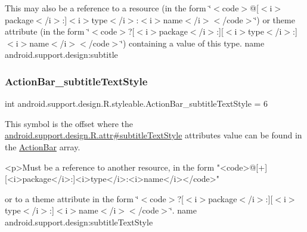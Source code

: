 This may also be a reference to a resource (in the form \char`\"{}$<$code$>$@\mbox{[}$<$i$>$package$<$/i$>$\+:\mbox{]}$<$i$>$type$<$/i$>$\+:$<$i$>$name$<$/i$>$$<$/code$>$\char`\"{}) or theme attribute (in the form \char`\"{}$<$code$>$?\mbox{[}$<$i$>$package$<$/i$>$\+:\mbox{]}\mbox{[}$<$i$>$type$<$/i$>$\+:\mbox{]}$<$i$>$name$<$/i$>$$<$/code$>$\char`\"{}) containing a value of this type.  name android.\+support.\+design\+:subtitle \mbox{\label{classandroid_1_1support_1_1design_1_1R_1_1styleable_a0773b4b5cb408a7cf70b187a6507fd8c}} 
\subsubsection{\texorpdfstring{Action\+Bar\+\_\+subtitle\+Text\+Style}{ActionBar\_subtitleTextStyle}}
{\footnotesize\ttfamily int android.\+support.\+design.\+R.\+styleable.\+Action\+Bar\+\_\+subtitle\+Text\+Style = 6\hspace{0.3cm}{\ttfamily [static]}}

This symbol is the offset where the \hyperlink{classandroid_1_1support_1_1design_1_1R_1_1attr_a2d8877abb4f0cd5569d1e413558667b7}{android.\+support.\+design.\+R.\+attr\#subtitle\+Text\+Style} attribute\textquotesingle{}s value can be found in the \hyperlink{classandroid_1_1support_1_1design_1_1R_1_1styleable_ab795220a96557d11f8c21359b95bed82}{Action\+Bar} array.

\begin{DoxyVerb}      <p>Must be a reference to another resource, in the form "<code>@[+][<i>package</i>:]<i>type</i>:<i>name</i></code>"
\end{DoxyVerb}
 or to a theme attribute in the form \char`\"{}$<$code$>$?\mbox{[}$<$i$>$package$<$/i$>$\+:\mbox{]}\mbox{[}$<$i$>$type$<$/i$>$\+:\mbox{]}$<$i$>$name$<$/i$>$$<$/code$>$\char`\"{}.  name android.\+support.\+design\+:subtitle\+Text\+Style \mbox{\label{classandroid_1_1support_1_1design_1_1R_1_1styleable_a0b7043e37b09ed435f5845bbad61bcb5}} 
